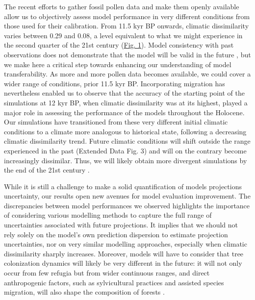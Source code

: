 \documentclass[pdflatex, sn-nature]{sn-jnl}%
\begin{document}
The recent efforts to gather fossil pollen data and make them openly available \cite{Williams2018} allow us to objectively assess model performance in very different conditions from those used for their calibration. From 11.5 kyr BP onwards, climatic dissimilarity varies between 0.29 and 0.08, a level equivalent to what we might experience in the second quarter of the 21st century (\hyperref[climatic_dissimilarity]{Fig. 1}). Model consistency with past observations does not demonstrate that the model will be valid in the future \cite{Oreskes1994}, but we make here a critical step towards enhancing our understanding of model transferability. As more and more pollen data becomes available, we could cover a wider range of conditions, prior 11.5 kyr BP. Incorporating migration has nevertheless enabled us to observe that the accuracy of the starting point of the simulations at 12 kyr BP, when climatic dissimilarity was at its highest, played a major role in assessing the performance of the models throughout the Holocene. Our simulations have transitioned from these very different initial climatic conditions to a climate more analogous to historical state, following a decreasing climatic dissimilarity trend. Future climatic conditions will shift outside the range experienced in the past (Extended Data Fig. 3) and will on the contrary become increasingly dissimilar. Thus, we will likely obtain more divergent simulations by the end of the 21st century \cite{Cheaib2012}.

While it is still a challenge to make a solid quantification of models projections uncertainty, our results open new avenues for model evaluation improvement. The discrepancies between model performances we observed highlights the importance of considering various modelling methods to capture the full range of uncertainties associated with future projections. It implies that we should not rely solely on the model's own prediction dispersion to estimate projection uncertainties, nor on very similar modelling approaches, especially when climatic dissimilarity sharply increases. Moreover, models will have to consider that tree colonization dynamics will likely be very different in the future: it will not only occur from few refugia but from wider continuous ranges, and direct anthropogenic factors, such as sylvicultural practices and assisted species migration, will also shape the composition of forests \cite{Aitken2016}.
\end{document}
